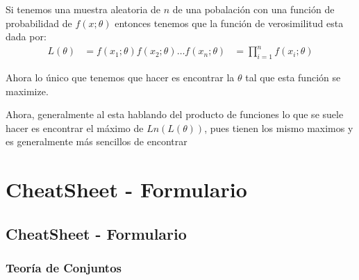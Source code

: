 \documentclass[12pt, fleqn]{report}                             %
\theoremstyle{break}                                            %
\begin{document}
            Si tenemos una muestra aleatoria de $n$ de una pobalación con una función
            de probabilidad de $f(x; \theta)$ entonces tenemos que la función
            de verosimilitud esta dada por:
            \begin{align*}
                L(\theta) 
                    &= f(x_1; \theta) f(x_2; \theta) \dots f(x_n; \theta)
                    &= \prod_{i = 1}^n f(x_i; \theta)
            \end{align*}

            Ahora lo único que tenemos que hacer es encontrar la $\theta$
            tal que esta función se maximize.

            Ahora, generalmente al esta hablando del producto de funciones lo
            que se suele hacer es encontrar el máximo de $Ln(L(\theta))$, 
            pues tienen los mismo maximos y es generalmente más sencillos de encontrar


        




\part{CheatSheet - Formulario}
\clearpage


    \chapter{CheatSheet - Formulario}


        \clearpage
        \section{Teoría de Conjuntos}
\end{document}
